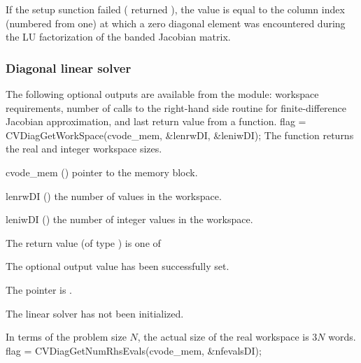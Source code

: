 {
  If the {\cvband} setup sunction failed ( returned ),
  the value  is equal to the column index (numbered from one) at which
  a zero diagonal element was encountered during the LU factorization of the 
  banded Jacobian matrix.
}

\subsubsection{Diagonal linear solver}\label{sss:optout_diag}
The following optional outputs are available from the {\cvdiag} module:
workspace requirements, number of calls to the right-hand side routine for 
finite-difference Jacobian approximation, and last return value from a 
{\cvdiag} function.
{
  flag = CVDiagGetWorkSpace(cvode\_mem, \&lenrwDI, \&leniwDI);
}
{
  The function  returns the
  {\cvdiag} real and integer workspace sizes.
}
{
  \begin{args}
  \item[cvode\_mem] ()
    pointer to the {\cvode} memory block.
  \item[lenrwDI] ()
    the number of  values in the {\cvdiag} workspace.
  \item[leniwDI] ()
    the number of integer values in the {\cvdiag} workspace.
  \end{args}
}
{
  The return value  (of type ) is one of
  \begin{args}
  \item[\Id{CVDIAG\_SUCCESS}] 
    The optional output value has been successfully set.
  \item[\Id{CVDIAG\_MEM\_NULL}]
    The  pointer is .
  \item[\Id{CVDIAG\_LMEM\_NULL}]
    The {\cvdiag} linear solver has not been initialized.
  \end{args}
}
{
  In terms of the problem size $N$, the actual size of the real workspace
  is $3 N$  words.
}
{
  flag = CVDiagGetNumRhsEvals(cvode\_mem, \&nfevalsDI);
}
